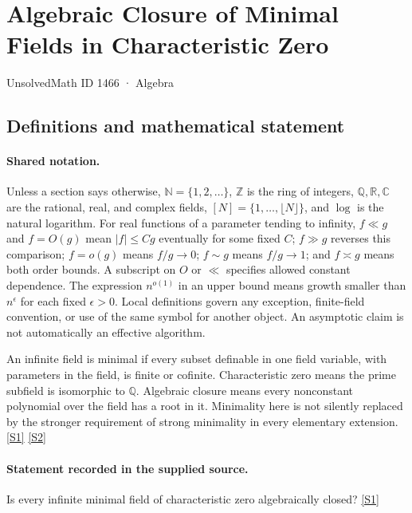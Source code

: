 \documentclass[11pt,a4paper]{article}
\newcommand{\N}{\mathbb{N}}
\newcommand{\Z}{\mathbb{Z}}
\newcommand{\Q}{\mathbb{Q}}
\newcommand{\R}{\mathbb{R}}
\newcommand{\C}{\mathbb{C}}
\newcommand{\sref}[2]{\hyperlink{source:#1:#2}{[S#2]}}
\begin{document}

\setcounter{section}{1465}

\section{Algebraic Closure of Minimal Fields in Characteristic Zero}\label{1466}

{\small\sffamily UnsolvedMath ID 1466 · Algebra}

\subsection{Definitions and mathematical statement}

\paragraph{Shared notation.}Unless a section says otherwise, $\N=\{1,2,\ldots\}$,
$\Z$ is the ring of integers, $\Q,\R,\C$ are the rational, real, and complex
fields, $[N]=\{1,\ldots,\lfloor N\rfloor\}$, and $\log$ is the natural
logarithm. For real functions of a parameter tending to infinity,
$f\ll g$ and $f=O(g)$ mean $|f|\leq Cg$ eventually for some fixed $C$;
$f\gg g$ reverses this comparison; $f=o(g)$ means $f/g\to0$;
$f\sim g$ means $f/g\to1$; and $f\asymp g$ means both order bounds.
A subscript on $O$ or $\ll$ specifies allowed constant dependence.
The expression $n^{o(1)}$ in an upper bound means growth smaller than
$n^\epsilon$ for each fixed $\epsilon>0$. Local definitions govern any
exception, finite-field convention, or use of the same symbol for another
object. An asymptotic claim is not automatically an effective algorithm.



An infinite field is minimal if every subset definable in one field variable, with parameters in the field, is finite or cofinite. Characteristic zero means the prime subfield is isomorphic to $\Q$. Algebraic closure means every nonconstant polynomial over the field has a root in it. Minimality here is not silently replaced by the stronger requirement of strong minimality in every elementary extension. \sref{1466}{1} \sref{1466}{2}

\paragraph{Statement recorded in the supplied source.}
Is every infinite minimal field of characteristic zero algebraically closed? \sref{1466}{1}
\end{document}

